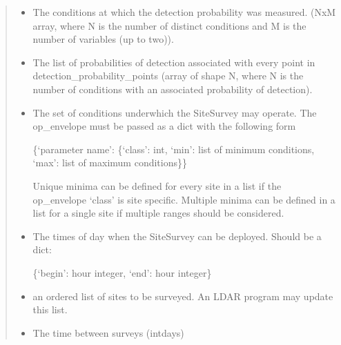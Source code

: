 \documentclass[letterpaper,10pt,english]{sphinxmanual}
\begin{document}
\begin{fulllineitems}
\begin{quote}
\begin{description}
\begin{itemize}
\item {} 
 \textendash{} The conditions at which the detection probability was measured. (NxM
array, where N is the number of distinct conditions and M is the number of variables (up to two)).

\item {} 
 \textendash{} The list of probabilities of detection associated with every point in
detection\_probability\_points (array of shape N, where N is the number of conditions with an associated
probability of detection).

\item {} 
 \textendash{} 
The set of conditions underwhich the SiteSurvey may operate. The op\_envelope must be
passed as a dict with the following form\textendash{}

\{‘parameter name’: \{‘class’: int, ‘min’: list of minimum conditions, ‘max’: list of maximum conditions\}\}

Unique minima can be defined for every site in a list if the op\_envelope ‘class’ is site specific. Multiple
minima can be defined in a list for a single site if multiple ranges should be considered.


\item {} 
 \textendash{} 
The times of day when the SiteSurvey can be deployed. Should be a dict:

\{‘begin’: hour integer, ‘end’: hour integer\}


\item {} 
 \textendash{} an ordered list of sites to be surveyed. An LDAR program may update this list.

\item {} 
 \textendash{} The time between surveys (int\textendash{}days)

\end{itemize}

\end{description}\end{quote}


\end{fulllineitems}
\end{document}
